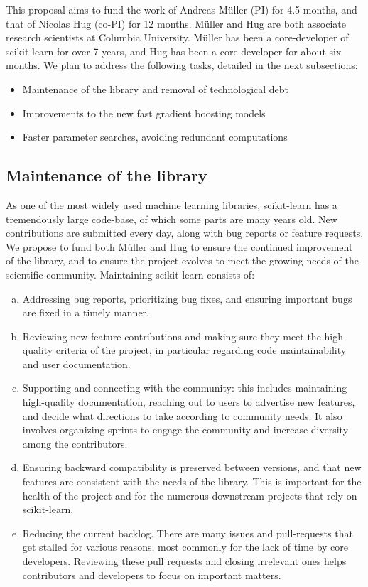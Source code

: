 \documentclass[11pt]{article}  %
\begin{document}
This proposal aims to fund the work of Andreas M\"uller (PI) for 4.5 months,
and that of Nicolas Hug (co-PI) for 12 months. M\"uller and Hug are both
associate research scientists at Columbia University. M\"uller has been a
core-developer of scikit-learn for over 7 years, and Hug has been a core
developer for about six months. We plan to address the following tasks,
detailed in the next subsections:
\begin{itemize}
\item Maintenance of the library and removal of technological debt
\item Improvements to the new fast gradient boosting models
\item Faster parameter searches, avoiding redundant computations
\end{itemize}

\subsection{Maintenance of the library}

As one of the most widely used machine learning libraries, scikit-learn has
a tremendously large code-base, of which some parts are many years old. New contributions are submitted every day, along with bug reports or
feature requests. We propose to fund both M\"uller and Hug to ensure the
continued improvement of the library, and to ensure the project evolves to
meet the growing needs of the scientific community. Maintaining scikit-learn consists of:

\begin{enumerate}[a)]
\item Addressing bug reports, prioritizing bug fixes, and ensuring important bugs are fixed in a timely manner.
\item Reviewing new feature contributions and making sure they meet the high
quality criteria of the project, in particular regarding code
maintainability and user documentation.
\item Supporting and connecting with the community: this includes
maintaining high-quality documentation, reaching out to users to advertise
new features, and decide what directions to take according to community
needs. It also involves organizing sprints to engage the community and
increase diversity among the contributors.
\item Ensuring backward compatibility is preserved between versions, and
that new features are consistent with the needs of the library. This is
important for the health of the project and for the numerous downstream
projects that rely on scikit-learn.
\item Reducing the current backlog. There are many issues and pull-requests that get stalled for various reasons, most commonly for the lack of time by core developers. Reviewing these pull requests and closing irrelevant ones helps contributors and developers to focus on important matters.
\end{enumerate}
\end{document}
